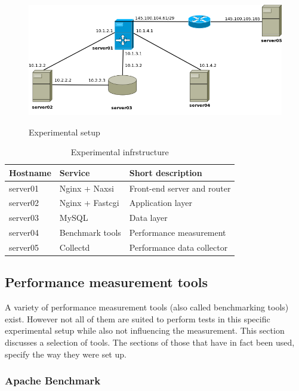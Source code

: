 \documentclass[Methods]{subfiles}
\begin{document}
\begin{figure}[h]
\caption{Experimental setup}
\centering
\includegraphics[scale=0.4] {images/infrastructure.png}
\label{fig:Experimental setup}
\end{figure}

\begin{table}[h]
\caption{Experimental infrstructure}
\begin{tabular}{|p{}|p{}|p{5cm}|}
\hline
\textbf{Hostname} & \textbf{Service} & \textbf{Short description} \\ \hline
server01 & Nginx + Naxsi & Front-end server and router \\ \hline
server02 & Nginx + Fastcgi & Application layer \\ \hline
server03 & MySQL & Data layer \\ \hline
server04 & Benchmark tools & Performance measurement \\ \hline
server05 & Collectd & Performance data collector \\ \hline
\end{tabular}
\label{tab:Experimental infrastructure}
\end{table}

\subsection{Performance measurement tools}
A variety of performance measurement tools (also called benchmarking tools) exist. However not all of them are suited to perform tests in this specific experimental setup while also not influencing the measurement. This section discusses a selection of tools. The sections of those that have in fact been used, specify the way they were set up.

\subsubsection{Apache Benchmark}
%
\end{document}
